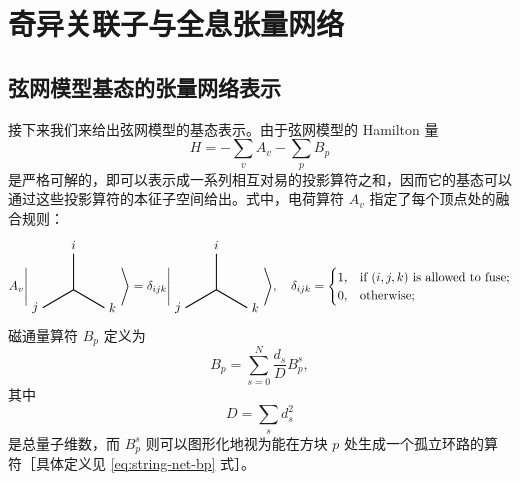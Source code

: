 \chapter{奇异关联子与全息张量网络}
\label{chap:strange-correlator}

\tikzset{x=1em, y=1em, node font=\footnotesize}
\newcommand{\Vertex}[3]{
  \begin{tikzpicture}[baseline=0, thick]
    \draw (0,0) -- (90:1)  node [above] {$#1$}
          (0,0) -- (210:1) node [left]  {$#2$}
          (0,0) -- (330:1) node [right] {$#3$};
  \end{tikzpicture}
}

\section{弦网模型基态的张量网络表示}

接下来我们来给出弦网模型的基态表示\cite{gu2009tensor2,buerschaper2009explicit}。由于弦网模型的 Hamilton 量
\begin{equation}
  H = -\sum_v A_v - \sum_p B_p
\end{equation}
是严格可解的，即可以表示成一系列相互对易的投影算符之和，因而它的基态可以通过这些投影算符的本征子空间给出。式中，电荷算符 $A_v$ 指定了每个顶点处的融合规则：
\begin{equation}
  A_v \Biggl| \Vertex ijk \Biggr\rangle = \delta_{ijk} \Biggl| \Vertex ijk \Biggr\rangle, \quad
  \delta_{ijk} = \begin{cases}
    1, & \text{if $(i,j,k)$ is allowed to fuse;} \\
    0, & \text{otherwise;}
  \end{cases}
\end{equation}
磁通量算符 $B_p$ 定义为
\begin{equation}
  B_p = \sum_{s=0}^N \frac{d_s}{D} B_p^s,
\end{equation}
其中
\begin{equation}
  D = \sum_s d_s^2
\end{equation}
是总量子维数，而 $B_p^s$ 则可以图形化地视为能在方块 $p$ 处生成一个孤立环路的算符［具体定义见 \eqref{eq:string-net-bp} 式］。

